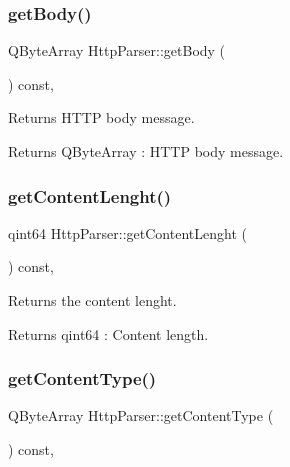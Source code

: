 \subsubsection{\texorpdfstring{get\+Body()}{getBody()}}
{\footnotesize\ttfamily Q\+Byte\+Array Http\+Parser\+::get\+Body (\begin{DoxyParamCaption}{ }\end{DoxyParamCaption}) const\hspace{0.3cm}{\ttfamily [inline]}, {\ttfamily [noexcept]}}



Returns H\+T\+TP body message. 

\begin{DoxyReturn}{Returns}
Q\+Byte\+Array \+: H\+T\+TP body message. 
\end{DoxyReturn}
\mbox{\label{class_http_parser_a3feddc6667494af792866935f4ccf794}} 
\subsubsection{\texorpdfstring{get\+Content\+Lenght()}{getContentLenght()}}
{\footnotesize\ttfamily qint64 Http\+Parser\+::get\+Content\+Lenght (\begin{DoxyParamCaption}{ }\end{DoxyParamCaption}) const\hspace{0.3cm}{\ttfamily [inline]}, {\ttfamily [noexcept]}}



Returns the content lenght. 

\begin{DoxyReturn}{Returns}
qint64 \+: Content length. 
\end{DoxyReturn}
\mbox{\label{class_http_parser_ae17e4400169606e640fda4be21a5421b}} 
\subsubsection{\texorpdfstring{get\+Content\+Type()}{getContentType()}}
{\footnotesize\ttfamily Q\+Byte\+Array Http\+Parser\+::get\+Content\+Type (\begin{DoxyParamCaption}{ }\end{DoxyParamCaption}) const\hspace{0.3cm}{\ttfamily [inline]}, {\ttfamily [noexcept]}}



